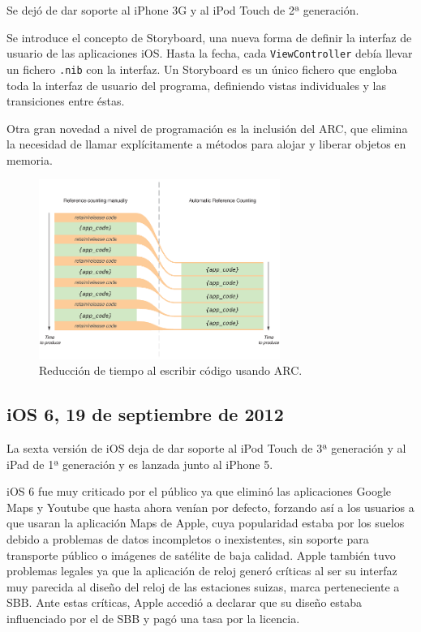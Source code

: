 Se dejó de dar soporte al iPhone 3G y al iPod Touch de 2ª generación.

Se introduce el concepto de Storyboard, una nueva forma de definir la interfaz de usuario de las aplicaciones iOS. Hasta la fecha, cada \texttt{ViewController} debía llevar un fichero \texttt{.nib} con la interfaz. Un Storyboard es un único fichero que engloba toda la interfaz de usuario del programa, definiendo vistas individuales y las transiciones entre éstas.

Otra gran novedad a nivel de programación es la inclusión del ARC, que elimina la necesidad de llamar explícitamente a métodos para alojar y liberar objetos en memoria.

\begin{figure}[h]
	\centering
		\includegraphics[width=0.7\textwidth]{./img/ARC.png}
	\caption{Reducción de tiempo al escribir código usando ARC.}
\end{figure}

\subsection{iOS 6, 19 de septiembre de 2012}
La sexta versión de iOS deja de dar soporte al iPod Touch de 3ª generación y al iPad de 1ª generación y es lanzada junto al iPhone 5.

iOS 6 fue muy criticado por el público ya que eliminó las aplicaciones Google Maps y Youtube que hasta ahora venían por defecto, forzando así a los usuarios a que usaran la aplicación Maps de Apple, cuya popularidad estaba por los suelos debido a problemas de datos incompletos o inexistentes, sin soporte para transporte público o imágenes de satélite de baja calidad. Apple también tuvo problemas legales ya que la aplicación de reloj generó críticas al ser su interfaz muy parecida al diseño del reloj de las estaciones suizas, marca perteneciente a SBB. Ante estas críticas, Apple accedió a declarar que su diseño estaba influenciado por el de SBB y pagó una tasa por la licencia. \cite{SwissWatch}

